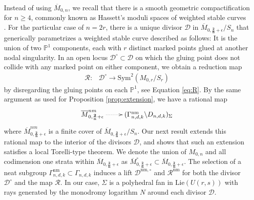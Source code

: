 \documentclass[12pt, letterpaper]{amsart}
\theoremstyle{plain}
\theoremstyle{definition}
\begin{document}
Instead of using $\overline{M}_{0,n}$, we recall that there is a smooth geometric compactification for $n \geq  4$, commonly known as Hassett's moduli spaces of weighted stable curves \cite{hassett2003moduli}. For the particular case of $n =  2r$, there is a unique divisor $\mathcal{D}$ in  
$\overline{M}_{0,\mathbf{\frac{2}{n}} + \epsilon}/S_n$ that generically parametrizes a weighted stable curve described as follows: 
It is the union of two $\mathbb{P}^1$ components, each with $r$ distinct marked points glued at another nodal singularity. 
In an open locus $\mathcal{D}^{\circ} \subset \mathcal{D}$ on which the gluing point does not collide with any marked point on either component, we obtain a reduction map 
\begin{align*}
\mathcal{R}:& \mathcal{D}^{\circ} \longrightarrow \mathrm{Sym}^2(M_{0,r}/S_r)
\end{align*}
by disregarding the gluing points on each $\mathbb{P}^1$, see Equation \eqref{eq:R}.  By
the same argument as used for Proposition \ref{prop:extension}, we have a rational map 
$$
\xymatrix{
\overline{M}_{0,\mathbf{\frac{2}{n}} + \epsilon}^{nm}
\ar@{.>}[r]& 
(\Gamma^{\mathrm{nm}}_{n,d,k}\backslash D_{n,d,k})_{\Sigma}
}
$$
where $\overline{M}_{0,\mathbf{\frac{2}{n}} + \epsilon}^{nm}$ is a finite cover of $\overline{M}_{0,\mathbf{\frac{2}{n}} + \epsilon}/S_n$.  Our next result extends this rational map to the interior of the divisors $\mathcal{D}$, and shows that such an extension satisfies a local Torelli-type theorem. 
We denote the union of $M_{0,n}$ and all codimension one strata within $\overline{M}_{0,\mathbf{\frac{2}{n}} + \epsilon}$ 
as $\overline{M}^{\circ}_{0,\mathbf{\frac{2}{n}} + \epsilon} \subset \overline{M}_{0,\mathbf{\frac{2}{n}} + \epsilon}$. 
The selection of a neat subgroup $\Gamma^{\mathrm{nm}}_{n,d,k} \subset 
\Gamma_{n,d,k}$ induces a lift $\mathcal{D}^{\mathrm{nm},\circ}$ and $\mathcal{R}^{\mathrm{nm}}$ for both the divisor $\mathcal{D}^{\circ}$ and the map $\mathcal{R}$. 
In our case, $\Sigma$ is a polyhedral fan in $\mathrm{Lie}(U(r,s))$ with rays generated by the monodromy logarithm $N$ around each divisor $\mathcal{D}$. 
\end{document}
